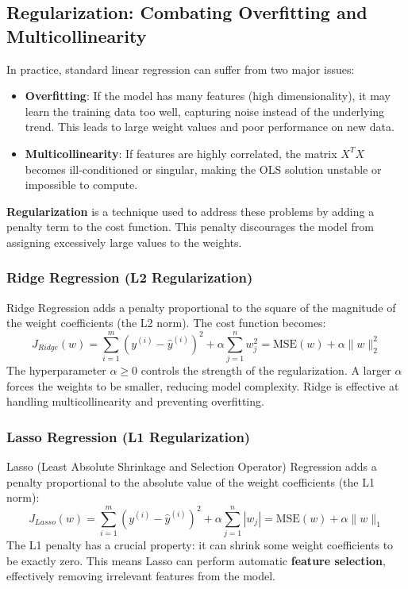\subsection*{Regularization: Combating Overfitting and Multicollinearity}
In practice, standard linear regression can suffer from two major issues:
\begin{itemize}
    \item \textbf{Overfitting}: If the model has many features (high dimensionality), it may learn the training data too well, capturing noise instead of the underlying trend. This leads to large weight values and poor performance on new data.
    \item \textbf{Multicollinearity}: If features are highly correlated, the matrix $X^T X$ becomes ill-conditioned or singular, making the OLS solution unstable or impossible to compute.
\end{itemize}
\textbf{Regularization} is a technique used to address these problems by adding a penalty term to the cost function. This penalty discourages the model from assigning excessively large values to the weights.

\subsubsection*{Ridge Regression (L2 Regularization)}
Ridge Regression adds a penalty proportional to the square of the magnitude of the weight coefficients (the L2 norm). The cost function becomes:
$$ J_{Ridge}(w) = \sum_{i=1}^{m} (y^{(i)} - \hat{y}^{(i)})^2 + \alpha \sum_{j=1}^{n} w_j^2 = \text{MSE}(w) + \alpha \|w\|_2^2 $$
The hyperparameter $\alpha \ge 0$ controls the strength of the regularization. A larger $\alpha$ forces the weights to be smaller, reducing model complexity. Ridge is effective at handling multicollinearity and preventing overfitting.

\subsubsection*{Lasso Regression (L1 Regularization)}
Lasso (Least Absolute Shrinkage and Selection Operator) Regression adds a penalty proportional to the absolute value of the weight coefficients (the L1 norm):
$$ J_{Lasso}(w) = \sum_{i=1}^{m} (y^{(i)} - \hat{y}^{(i)})^2 + \alpha \sum_{j=1}^{n} |w_j| = \text{MSE}(w) + \alpha \|w\|_1 $$
The L1 penalty has a crucial property: it can shrink some weight coefficients to be exactly zero. This means Lasso can perform automatic \textbf{feature selection}, effectively removing irrelevant features from the model.

